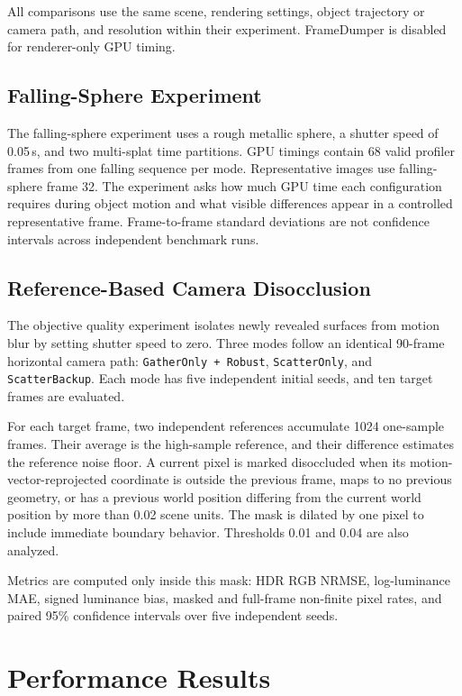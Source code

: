 \documentclass[10pt,twocolumn]{article}
\newcommand{\method}[1]{\texttt{#1}}
\begin{document}
All comparisons use the same scene, rendering settings, object trajectory or
camera path, and resolution within their experiment. FrameDumper is disabled
for renderer-only GPU timing.

\subsection{Falling-Sphere Experiment}

The falling-sphere experiment uses a rough metallic sphere, a shutter speed of
0.05\,s, and two multi-splat time partitions. GPU timings contain 68 valid
profiler frames from one falling sequence per mode. Representative images use
falling-sphere frame 32. The experiment asks how much GPU time each
configuration requires during object motion and what visible differences
appear in a controlled representative frame. Frame-to-frame standard
deviations are not confidence intervals across independent benchmark runs.

\subsection{Reference-Based Camera Disocclusion}

The objective quality experiment isolates newly revealed surfaces from motion
blur by setting shutter speed to zero. Three modes follow an identical
90-frame horizontal camera path: \method{GatherOnly + Robust},
\method{ScatterOnly}, and \method{ScatterBackup}. Each mode has five
independent initial seeds, and ten target frames are evaluated.

For each target frame, two independent references accumulate 1024 one-sample
frames. Their average is the high-sample reference, and their difference
estimates the reference noise floor. A current pixel is marked disoccluded
when its motion-vector-reprojected coordinate is outside the previous frame,
maps to no previous geometry, or has a previous world position differing from
the current world position by more than 0.02 scene units. The mask is dilated
by one pixel to include immediate boundary behavior. Thresholds 0.01 and 0.04
are also analyzed.

Metrics are computed only inside this mask: HDR RGB NRMSE, log-luminance MAE,
signed luminance bias, masked and full-frame non-finite pixel rates, and paired
95\% confidence intervals over five independent seeds.

\section{Performance Results}
\end{document}
